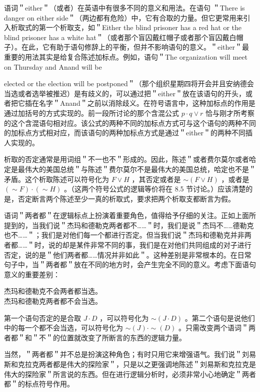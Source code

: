 语词＂either＂（或者）在英语中有很多不同的意义和用法。在语句 ＂There is danger on either side＂（两边都有危险）中，它有合取的力量。但它更常用来引入析取式的第一个析取支，如＂Either the blind prisoner has a red hat or the blind prisoner has a white hat＂（或者那个盲囚戴红帽子或者那个盲囚戴白帽子）。在此，它有助于语句修辞上的平衡，但并不影响语句的意义。＂either＂最重要的用法其实是给复合陈述加标点。例如，语句＂The organization will meet on Thursday and Anand will be

elected or the election will be postponed＂（那个组织星期四将开会并且安纳德会当选或者选举被推迟）是有歧义的，可以通过把＂either＂放在该语句的开头，或者把它插在名字＂Anand＂之前以消除歧义。在符号语言中，这种加标点的作用是通过加括号的方式实现的。前一段所讨论的那个含混公式 $p \cdot q \vee r$ 恰与刚才所考察的这个含混语句相对应。该公式的两种不同的加标点方式可与这个语句的两种不同的加标点方式相对应，而该语句的两种加标点方式是通过＂either＂的两种不同插人实现的。

析取的否定通常是用词组＂不一也不＂形成的。因此，陈述＂或者费尔莫尔或者哈定是最伟大的美国总统＂与陈述＂费尔莫尔不是最伟大的美国总统，哈定也不是＂矛盾。这个析取陈述可以符号化为 $F \vee H$ ，其否定或者是 $\sim(F \vee H)$ ，或者是 $(\sim F) \cdot(\sim H)$ 。（这两个符号公式的逻辑等价将在 8.5 节讨论。）应该清楚的是，否定断言两个陈述至少一真的析取式，要求把两个析取支都断言为假。

语词＂两者都＂在逻辑标点上扮演着重要角色，值得给予仔细的关注。正如上面所提到的，当我们说＂杰玛和德勒克两者都不……＂时，我们是说＂杰玛不……德勒克也不……＂；我们是对他们每一个都进行否定。但当我们说＂杰玛和德勒克并非两者都……＂时，说的却是某件非常不同的事，我们是在对他们共同组成的对子进行否定，说的是＂他们两者都……情况并非如此＂。这种差别是非常根本的。在日常句子中，当＂两者都＂放在不同的地方时，会产生完全不同的意义。考虑下面语句意义的重要差别：

杰玛和德勒克不会两者都当选。\\
杰玛和德勒克两者都不会当选。

第一个语句否定的是合取 $J \cdot D$ ，可以符号化为 $\sim(J \cdot D)$ 。第二个语句是说他们中的每一个都不会当选，可以符号化为 $\sim(J) \cdot \sim(D)$ 。只需改变两个语词＂两者都＂和＂不＂的位置就改变了所断言的东西的逻辑力量。

当然，＂两者都＂并不总是扮演这种角色；有时只用它来增强语气。我们说＂刘易斯和克拉克两者都是伟大的探险家＂，只是以之更强调地陈述＂刘易斯和克拉克是伟大的探险家＂所言说的东西。但在进行逻辑分析时，必须非常小心地确定＂两者都＂的标点符号作用。

